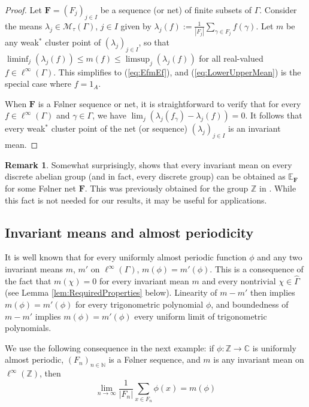 \documentclass[12pt]{amsart} \usepackage{amsmath,centernot,amssymb,leftindex}
\newcommand{\mb}{\mathbf}
\numberwithin{theorem}{section}
\numberwithin{equation}{section}
\theoremstyle{definition}
\newtheorem{remark}[theorem]{Remark}
\begin{document}
	\begin{proof}		
		Let $\mb F=(F_{j})_{j\in I}$ be a sequence (or net) of finite subsets of $\Gamma$.  Consider the means $\lambda_{j}\in \mathcal M_{\tau}(\Gamma)$, $j\in I$ given by $\lambda_{j}(f):=\frac{1}{|F_{j}|}\sum_{\gamma\in F_{j}}f(\gamma)$.  Let $m$ be any weak$^{*}$ cluster point of $(\lambda_{j})_{j\in I}$, so that $\liminf_{j}(\lambda_{j}(f))\leq m(f)\leq \limsup_{j}(\lambda_{j}(f))$ for all real-valued $f\in \ell^{\infty}(\Gamma)$.  This simplifies to (\ref{eq:EfmEf}), and (\ref{eq:LowerUpperMean}) is the special case where $f=1_{A}$.
		
		
		When $\mb F$ is a F{\o}lner sequence or net, it is straightforward to verify that for every $f\in \ell^{\infty}(\Gamma)$ and $\gamma\in \Gamma$, we have $\lim_{j}(\lambda_{j}(f_{\gamma})-\lambda_{j}(f))=0$. It follows that every weak$^{*}$ cluster point of the net (or sequence) $(\lambda_{j})_{j\in I}$ is an invariant mean.  
	\end{proof}


\begin{remark}
Somewhat surprisingly, \cite[Theorem 5.9]{Hopfensperger_WhenIsAMean} shows that every invariant mean on every discrete abelian group (and in fact, every discrete group) can be obtained as $\mathbb E_{\mb F}$ for some F{\o}lner net $\mb F$.  This was previously obtained for the group $\mathbb Z$ in \cite{HindmanStrauss_DensityAndInvariant}.  While this fact is not needed for our results, it may be useful for applications.
\end{remark}

\subsection{Invariant means and almost periodicity}


It is well known that for every uniformly almost periodic function $\phi$ and any two invariant means $m$, $m'$ on $\ell^{\infty}(\Gamma)$, $m(\phi)=m'(\phi)$. This is a consequence of the fact that $m(\chi)=0$ for every invariant mean $m$ and every nontrivial $\chi\in \widehat{\Gamma}$ (see Lemma \ref{lem:RequiredProperties} below). Linearity of $m-m'$ then implies $m(\phi)=m'(\phi)$ for every trigonometric polynomial $\phi$, and boundedness of $m-m'$  implies $m(\phi)=m'(\phi)$ every uniform limit of trigonometric polynomials.

We use the following consequence in the next example: if $\phi:\mathbb Z\to \mathbb C$ is uniformly almost periodic, $(F_{n})_{n\in \mathbb N}$ is a F{\o}lner sequence, and $m$ is any invariant mean on $\ell^{\infty}(\mathbb Z)$, then
\begin{equation}\label{eq:FolnerIndependent}
	\lim_{n\to\infty} \frac{1}{|F_{n}|}\sum_{x\in F_{n}} \phi(x)=m(\phi)
\end{equation}
	
\end{document}
